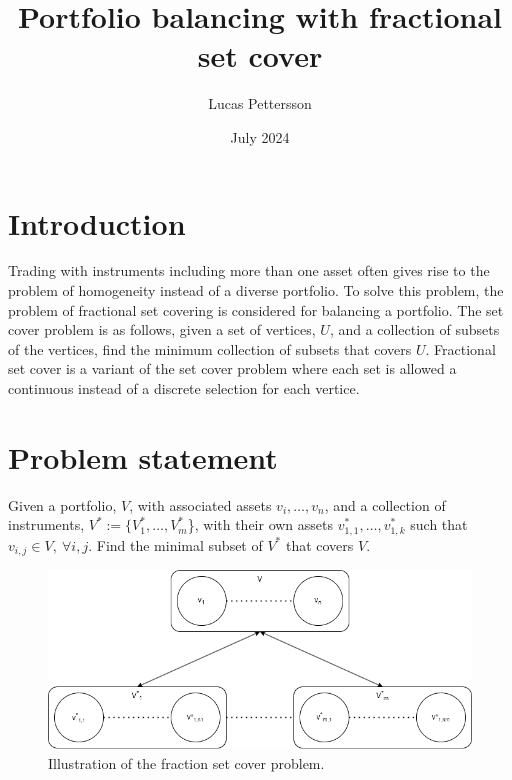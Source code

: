 \documentclass{article}
\title{Portfolio balancing with fractional set cover}
\author{Lucas Pettersson}
\date{July 2024}
\begin{document}
\maketitle
\newpage

\tableofcontents
\newpage


\section{Introduction}
Trading with instruments including more than one asset often gives rise to the problem of homogeneity instead of a diverse portfolio. To solve this problem, the problem of fractional set covering is considered for balancing a portfolio. The set cover problem is as follows, given a set of vertices, $U$, and a collection of subsets of the vertices, find the minimum collection of subsets that covers $U$. Fractional set cover is a variant of the set cover problem where each set is allowed a continuous instead of a discrete selection for each vertice. \cite{bib:fracCover} 

\section{Problem statement}
Given a portfolio, $V$, with associated assets $v_i, \ldots, v_n$, and a collection of instruments, $V^* := \{V^*_1, \ldots, V^*_m$\}, with their own assets $v^*_{1,1}, \ldots, v^*_{1,k}$ such that $v_{i,j} \in V,~\forall i,j$. Find the minimal subset of $V^*$ that covers $V$.

\begin{figure}[H]
    \centering
    \includegraphics[scale=0.4]{figures/fracCov.png}
    \caption{Illustration of the fraction set cover problem.}
    \label{fig:fracCov}
\end{figure}
\end{document}
